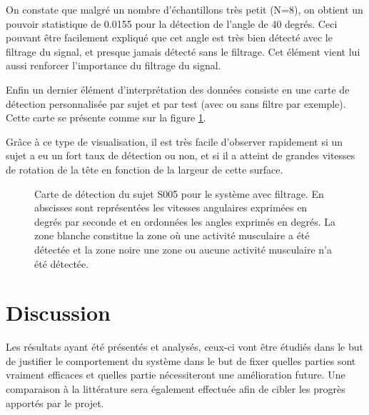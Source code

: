 \documentclass[letterpaper, twoside, 12pt, memoire, creativecommons, hyperref]{thETS}
\begin{document}
On constate que malgré un nombre d'échantillons très petit (N=8), on obtient un pouvoir statistique de 0.0155 pour la détection de l'angle de 40 degrés. Ceci pouvant être facilement expliqué que cet angle est très bien détecté avec le filtrage du signal, et presque jamais détecté sans le filtrage. Cet élément vient lui aussi renforcer l'importance du filtrage du signal.

Enfin un dernier élément d'interprétation des données consiste en une carte de détection personnalisée par sujet et par test (avec ou sans filtre par exemple).
Cette carte se présente comme sur la figure \ref{fig:cartedetection}.

Grâce à ce type de visualisation, il est très facile d'observer rapidement si un sujet a eu un fort taux de détection ou non, et si il a atteint de grandes vitesses de rotation de la tête en fonction de la largeur de cette surface.

\begin{figure}
	\centering
	\caption{Carte de détection du sujet S005 pour le système avec filtrage. En abscisses sont représentées les vitesses angulaires exprimées en degrés par seconde et en ordonnées les angles exprimés en degrés. La zone blanche constitue la zone où une activité musculaire a été détectée et la zone noire une zone ou aucune activité musculaire n'a été détectée. }
	\label{fig:cartedetection}
\end{figure}


\chapter{Discussion}

Les résultats ayant été présentés et analysés, ceux-ci vont être étudiés dans le but de justifier le comportement du système dans le but de fixer quelles parties sont vraiment efficaces et quelles partie nécessiteront une amélioration future. Une comparaison à la littérature sera également effectuée afin de cibler les progrès apportés par le projet.
\end{document}
